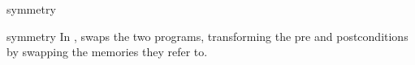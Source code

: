 \begin{tactic}{symmetry}
  \begin{tsyntax}{symmetry}
  In \prhl, swaps the two programs, transforming the pre and
  postconditions by swapping the memories they refer to.

  \begin{cmathpar}
      {}
      {}
  \end{cmathpar}
  \end{tsyntax}
\end{tactic}
